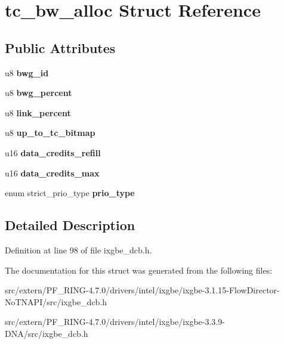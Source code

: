 \hypertarget{structtc__bw__alloc}{
\section{tc\_\-bw\_\-alloc Struct Reference}
\label{structtc__bw__alloc}
}
\subsection*{Public Attributes}
\begin{DoxyCompactItemize}
\item 
\hypertarget{structtc__bw__alloc_a85f05774fbf34ad087977647e33f6931}{
u8 {\bfseries bwg\_\-id}}
\label{structtc__bw__alloc_a85f05774fbf34ad087977647e33f6931}

\item 
\hypertarget{structtc__bw__alloc_a62549ef3a57ca5fb391ecf330c1dab93}{
u8 {\bfseries bwg\_\-percent}}
\label{structtc__bw__alloc_a62549ef3a57ca5fb391ecf330c1dab93}

\item 
\hypertarget{structtc__bw__alloc_a2d36b2d8a7f40172011e6d229cfc03fb}{
u8 {\bfseries link\_\-percent}}
\label{structtc__bw__alloc_a2d36b2d8a7f40172011e6d229cfc03fb}

\item 
\hypertarget{structtc__bw__alloc_a6610238e67667e5f4014f7494e812ecc}{
u8 {\bfseries up\_\-to\_\-tc\_\-bitmap}}
\label{structtc__bw__alloc_a6610238e67667e5f4014f7494e812ecc}

\item 
\hypertarget{structtc__bw__alloc_a40d2ddbcb0cc2c9059f9a42eb4450564}{
u16 {\bfseries data\_\-credits\_\-refill}}
\label{structtc__bw__alloc_a40d2ddbcb0cc2c9059f9a42eb4450564}

\item 
\hypertarget{structtc__bw__alloc_aa41a0cf41f06dc8417769aacaa77d247}{
u16 {\bfseries data\_\-credits\_\-max}}
\label{structtc__bw__alloc_aa41a0cf41f06dc8417769aacaa77d247}

\item 
\hypertarget{structtc__bw__alloc_af1ae88206b57036836000688e2c5744d}{
enum strict\_\-prio\_\-type {\bfseries prio\_\-type}}
\label{structtc__bw__alloc_af1ae88206b57036836000688e2c5744d}

\end{DoxyCompactItemize}


\subsection{Detailed Description}


Definition at line 98 of file ixgbe\_\-dcb.h.



The documentation for this struct was generated from the following files:\begin{DoxyCompactItemize}
\item 
src/extern/PF\_\-RING-\/4.7.0/drivers/intel/ixgbe/ixgbe-\/3.1.15-\/FlowDirector-\/NoTNAPI/src/ixgbe\_\-dcb.h\item 
src/extern/PF\_\-RING-\/4.7.0/drivers/intel/ixgbe/ixgbe-\/3.3.9-\/DNA/src/ixgbe\_\-dcb.h\end{DoxyCompactItemize}
